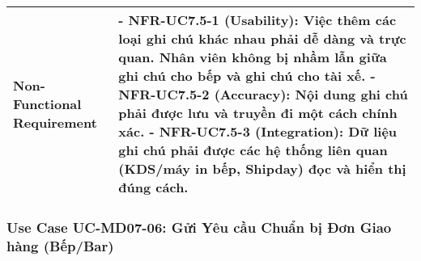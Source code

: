 \begin{longtable}{|m{4cm}|p{11cm}|}
\hline
Non-Functional Requirement & - \textbf{NFR-UC7.5-1 (Usability):} Việc thêm các loại ghi chú khác nhau phải dễ dàng và trực quan. Nhân viên không bị nhầm lẫn giữa ghi chú cho bếp và ghi chú cho tài xế. \newline - \textbf{NFR-UC7.5-2 (Accuracy):} Nội dung ghi chú phải được lưu và truyền đi một cách chính xác. \newline - \textbf{NFR-UC7.5-3 (Integration):} Dữ liệu ghi chú phải được các hệ thống liên quan (KDS/máy in bếp, Shipday) đọc và hiển thị đúng cách. \\
\hline
\end{longtable}

\subsubsection{Use Case UC-MD07-06: Gửi Yêu cầu Chuẩn bị Đơn Giao hàng (Bếp/Bar)}
